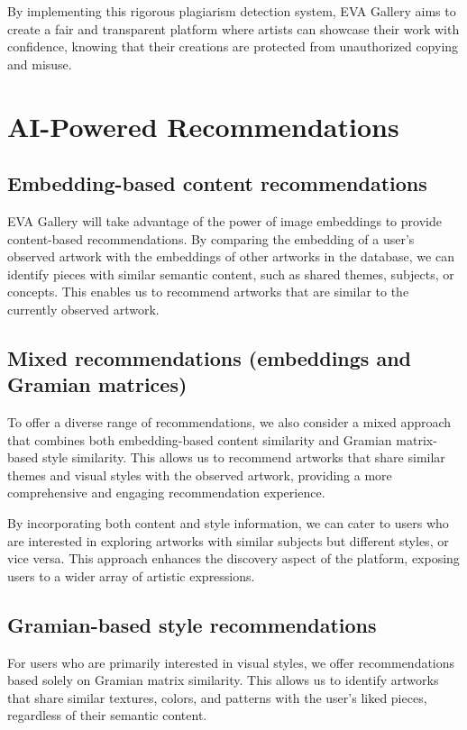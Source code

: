 By implementing this rigorous plagiarism detection system, EVA Gallery aims to create a fair and transparent platform where artists can showcase their work with confidence, knowing that their creations are protected from unauthorized copying and misuse.

\newpage
\section{AI-Powered Recommendations}

\subsection{Embedding-based content recommendations}
EVA Gallery will take advantage of the power of image embeddings to provide content-based recommendations. By comparing the embedding of a user's observed artwork with the embeddings of other artworks in the database, we can identify pieces with similar semantic content, such as shared themes, subjects, or concepts. This enables us to recommend artworks that are similar to the currently observed artwork.

\subsection{Mixed recommendations (embeddings and Gramian matrices)}
To offer a diverse range of recommendations, we also consider a mixed approach that combines both embedding-based content similarity and Gramian matrix-based style similarity. This allows us to recommend artworks that share similar themes and visual styles with the observed artwork, providing a more comprehensive and engaging recommendation experience.

By incorporating both content and style information, we can cater to users who are interested in exploring artworks with similar subjects but different styles, or vice versa. This approach enhances the discovery aspect of the platform, exposing users to a wider array of artistic expressions.

\subsection{Gramian-based style recommendations}
For users who are primarily interested in visual styles, we offer recommendations based solely on Gramian matrix similarity. This allows us to identify artworks that share similar textures, colors, and patterns with the user's liked pieces, regardless of their semantic content.

